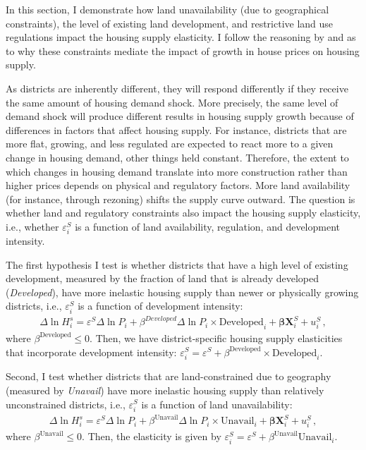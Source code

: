 \documentclass[
  12pt,
]{article}
\begin{document}
In this section, I demonstrate how land unavailability (due to geographical constraints), the level of existing land development, and restrictive land use regulations impact the housing supply elasticity. I follow the reasoning by \citet{saiz2010} and \citet{baumsnow-han2019} as to why these constraints mediate the impact of growth in house prices on housing supply.

As districts are inherently different, they will respond differently if they receive the same amount of housing demand shock. More precisely, the same level of demand shock will produce different results in housing supply growth because of differences in factors that affect housing supply. For instance, districts that are more flat, growing, and less regulated are expected to react more to a given change in housing demand, other things held constant. Therefore, the extent to which changes in housing demand translate into more construction rather than higher prices depends on physical and regulatory factors. More land availability (for instance, through rezoning) shifts the supply curve outward. The question is whether land and regulatory constraints also impact the housing supply elasticity, i.e., whether \(\varepsilon^S_i\) is a function of land availability, regulation, and development intensity.

The first hypothesis I test is whether districts that have a high level of existing development, measured by the fraction of land that is already developed (\emph{Developed}), have more inelastic housing supply than newer or physically growing districts, i.e., \(\varepsilon^S_i\) is a function of development intensity: \begin{align}
\Delta\ln H_i^s = \varepsilon^S\Delta\ln P_i + \beta^{Developed} \Delta \ln P_i\times\text{Developed}_i + \boldsymbol{\beta}\boldsymbol{X}_i^S + u^S_i\,, \label{eq:case-2}
\end{align} where \(\beta^{\text{Developed}} \le 0\). Then, we have district-specific housing supply elasticities that incorporate development intensity: \(\varepsilon^S_i = \varepsilon^S + \beta^{\text{Developed}}\times\text{Developed}_i\).

Second, I test whether districts that are land-constrained due to geography (measured by \emph{Unavail}) have more inelastic housing supply than relatively unconstrained districts, i.e., \(\varepsilon^S_i\) is a function of land unavailability: \begin{align}
\Delta\ln H_i^s = \varepsilon^S\Delta\ln P_i + \beta^{\text{Unavail}} \Delta \ln P_i\times\text{Unavail}_i + \boldsymbol{\beta}\boldsymbol{X}_i^S + u^S_i\,, \label{eq:case-3}
\end{align} where \(\beta^{\text{Unavail}} \le 0\). Then, the elasticity is given by \(\varepsilon^S_i = \varepsilon^S + \beta^{\text{Unavail}}\text{Unavail}_i\).
\end{document}
